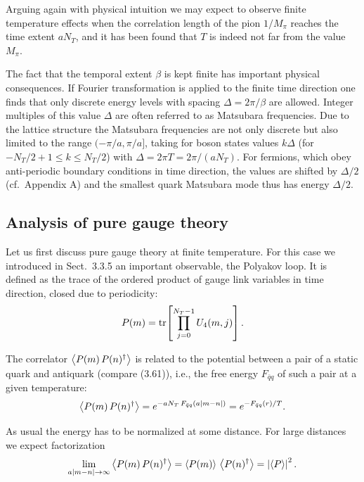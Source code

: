 Arguing again with physical intuition we may expect to observe finite
temperature effects when the correlation length of the pion $1/M_\pi$ reaches
the time extent $aN_T$, and it has been found that $T$ is indeed not far from
the value $M_\pi$.

The fact that the temporal extent $\beta$ is kept finite has important physical
consequences. If Fourier transformation is applied to the finite time direction
one finds that only discrete energy levels with spacing $\Delta = 2\pi/\beta$
are allowed. Integer multiples of this value $\Delta$ are often referred to as
Matsubara frequencies. Due to the lattice structure the Matsubara frequencies
are not only discrete but also limited to the range $(-\pi/a,\pi/a]$, taking
for boson states values $k\Delta$ (for $-N_T/2 + 1 \le k \le N_T/2$) with
$\Delta = 2\pi T = 2\pi/(aN_T)$. For fermions, which obey anti-periodic
boundary conditions in time direction, the values are shifted by $\Delta/2$
(cf.\ Appendix A) and the smallest quark Matsubara mode thus has energy
$\Delta/2$.

\subsection{Analysis of pure gauge theory}

Let us first discuss pure gauge theory at finite temperature. For this case we
introduced in Sect.~3.3.5 an important observable, the Polyakov loop. It is
defined as the trace of the ordered product of gauge link variables in time
direction, closed due to periodicity:
\begin{equation}
  P(m) = \operatorname{tr}\!\left[\prod_{j=0}^{N_T-1} U_4(m,j)\right].
\end{equation}

The correlator $\left\langle P(m)\,P(n)^\dagger \right\rangle$ is related to the potential between a
pair of a static quark and antiquark (compare (3.61)), i.e., the free energy
$F_{\bar{q}q}$ of such a pair at a given temperature:
\begin{equation}
  \left\langle P(m)\,P(n)^\dagger \right\rangle = e^{-a N_T\,F_{\bar{q}q}(a|m-n|)}
    = e^{-F_{\bar{q}q}(r)/T}.
\end{equation}

As usual the energy has to be normalized at some distance. For large distances
we expect factorization
\begin{equation}
  \lim_{a|m-n|\to\infty} \left\langle P(m)\,P(n)^\dagger \right\rangle
    = \left\langle P(m) \right\rangle\,\left\langle P(n)^\dagger \right\rangle = \left|\left\langle P \right\rangle\right|^2.
\end{equation}

